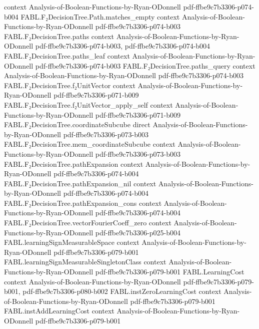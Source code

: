 \begin{theorem}
  {context}
  {Analysis-of-Boolean-Functions-by-Ryan-ODonnell}
  {pdf-ffbe9c7b3306-p074-b004}
\proofstep
  {FABL.F₂DecisionTree.Path.matches_empty}
  {context}
  {Analysis-of-Boolean-Functions-by-Ryan-ODonnell}
  {pdf-ffbe9c7b3306-p074-b003}
\proofstep
  {FABL.F₂DecisionTree.paths}
  {context}
  {Analysis-of-Boolean-Functions-by-Ryan-ODonnell}
  {pdf-ffbe9c7b3306-p074-b003,
    pdf-ffbe9c7b3306-p074-b004}
\proofstep
  {FABL.F₂DecisionTree.paths_leaf}
  {context}
  {Analysis-of-Boolean-Functions-by-Ryan-ODonnell}
  {pdf-ffbe9c7b3306-p074-b003}
\proofstep
  {FABL.F₂DecisionTree.paths_query}
  {context}
  {Analysis-of-Boolean-Functions-by-Ryan-ODonnell}
  {pdf-ffbe9c7b3306-p074-b003}
\proofstep
  {FABL.F₂DecisionTree.f₂UnitVector}
  {context}
  {Analysis-of-Boolean-Functions-by-Ryan-ODonnell}
  {pdf-ffbe9c7b3306-p071-b009}
\proofstep
  {FABL.F₂DecisionTree.f₂UnitVector_apply_self}
  {context}
  {Analysis-of-Boolean-Functions-by-Ryan-ODonnell}
  {pdf-ffbe9c7b3306-p071-b009}
\proofstep
  {FABL.F₂DecisionTree.coordinateSubcube}
  {direct}
  {Analysis-of-Boolean-Functions-by-Ryan-ODonnell}
  {pdf-ffbe9c7b3306-p073-b003}
\proofstep
  {FABL.F₂DecisionTree.mem_coordinateSubcube}
  {context}
  {Analysis-of-Boolean-Functions-by-Ryan-ODonnell}
  {pdf-ffbe9c7b3306-p073-b003}
\proofstep
  {FABL.F₂DecisionTree.pathExpansion}
  {context}
  {Analysis-of-Boolean-Functions-by-Ryan-ODonnell}
  {pdf-ffbe9c7b3306-p074-b004}
\proofstep
  {FABL.F₂DecisionTree.pathExpansion_nil}
  {context}
  {Analysis-of-Boolean-Functions-by-Ryan-ODonnell}
  {pdf-ffbe9c7b3306-p074-b004}
\proofstep
  {FABL.F₂DecisionTree.pathExpansion_cons}
  {context}
  {Analysis-of-Boolean-Functions-by-Ryan-ODonnell}
  {pdf-ffbe9c7b3306-p074-b004}
\proofstep
  {FABL.F₂DecisionTree.vectorFourierCoeff_zero}
  {context}
  {Analysis-of-Boolean-Functions-by-Ryan-ODonnell}
  {pdf-ffbe9c7b3306-p025-b004}
\proofstep
  {FABL.learningSignMeasurableSpace}
  {context}
  {Analysis-of-Boolean-Functions-by-Ryan-ODonnell}
  {pdf-ffbe9c7b3306-p079-b001}
\proofstep
  {FABL.learningSignMeasurableSingletonClass}
  {context}
  {Analysis-of-Boolean-Functions-by-Ryan-ODonnell}
  {pdf-ffbe9c7b3306-p079-b001}
\proofstep
  {FABL.LearningCost}
  {context}
  {Analysis-of-Boolean-Functions-by-Ryan-ODonnell}
  {pdf-ffbe9c7b3306-p079-b001,
    pdf-ffbe9c7b3306-p080-b002}
\proofstep
  {FABL.instZeroLearningCost}
  {context}
  {Analysis-of-Boolean-Functions-by-Ryan-ODonnell}
  {pdf-ffbe9c7b3306-p079-b001}
\proofstep
  {FABL.instAddLearningCost}
  {context}
  {Analysis-of-Boolean-Functions-by-Ryan-ODonnell}
  {pdf-ffbe9c7b3306-p079-b001}
\proofstep

\end{theorem}
